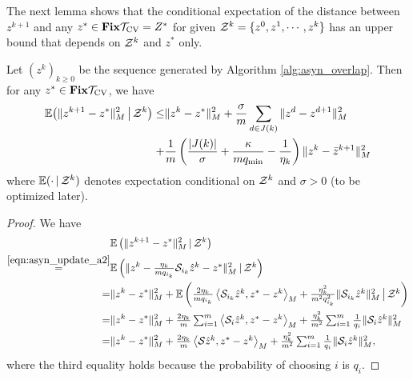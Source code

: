 {The next lemma shows that the conditional expectation of the distance between $z^{k+1}$ 
and any $z^*\in \mathbf{Fix} {{\mathcal{T}}_{\textnormal{CV}}}=Z^*$ for given ${\mathcal{Z}}^k=\{z^0,z^1,\cdots,z^k\}$ has an
upper bound that depends on ${\mathcal{Z}}^k$ and $z^*$ only.
\begin{lemma}\label{lemma:fund}
Let $(z^k)_{k\geq 0}$ be the sequence generated by Algorithm
\ref{alg:asyn_overlap}.  Then for
any $z^*\in \mathbf{Fix} {{\mathcal{T}}_{\textnormal{CV}}}$, we have
\begin{align}\label{eqn:fund_inquality0}
\begin{aligned}
\mathbb{E}\big(\|z^{k+1} - z^* \|_M^2 \,\big|\, \cZ^k\big)  \leq & \|z^{k} - z^*
\|_M^2  +{\sigma\over m}\sum_{d\in J(k)}\|z^d-z^{d+1}\|_M^2\\
+& {1\over m}\left({{|J(k)|}\over \sigma}+{\kappa\over
mq_{\min}}-{1\over \eta_k}\right)\|z^k-\bar z^{k+1}\|_M^2
\end{aligned}
\end{align}
where $\mathbb{E}(\cdot\,|\,{\mathcal{Z}}^k)$ denotes expectation  conditional on ${\mathcal{Z}}^k$ and $\sigma>0$ (to be optimized later).
\end{lemma}
\begin{proof}
We have
\begin{equation}\label{eqn:equality_inconsistent}
\begin{aligned}
&\mathbb{E}\left(\|z^{k+1} - z^*\|_M^2\,|\,\cZ^k\right)\\
\overset{\eqref{eqn:asyn_update_a2}}=&\mathbb{E}\left(\|z^{k}  -
\textstyle\frac{\eta_k}{mq_{i_k}}\cS_{i_k} \hat{z}^{k}- z^*
\|_M^2\,|\,\cZ^k\right)\\
=& \|z^k -
z^*\|_M^2+\mathbb{E}\left(\textstyle\frac{2\eta_k}{mq_{i_k}} \left\langle
\cS_{i_k} \hat{z}^{k}, z^* - z^k \right\rangle_M +
\textstyle\frac{\eta_k^2}{m^2q_{i_k}^2}
\|\cS_{i_k}\hat{z}^{k}\|_M^2\,\big|\,\cZ^k\right)\\
=&\|z^k -
z^*\|_M^2+\textstyle\frac{2\eta_k}{m} \sum_{i=1}^m\left\langle \cS_i
\hat{z}^{k}, z^* - z^k \right\rangle_M +
\frac{\eta_k^2}{m^2}\sum_{i=1}^m\frac{1}{q_i}\|\cS_i\hat{z}^{k}\|_M^2\\
=&\|z^k
- z^*\|_M^2+\textstyle\frac{2\eta_k}{m} \left\langle \cS \hat{z}^{k}, z^* - z^k
\right\rangle_M +\frac{\eta_k^2}{m^2} \sum_{i=1}^m\frac{1}{q_i}
\|\cS_i\hat{z}^{k}\|_M^2,
\end{aligned}
\end{equation}
where the third equality holds because the probability of choosing $i$ is $q_i$.


\end{proof}}
